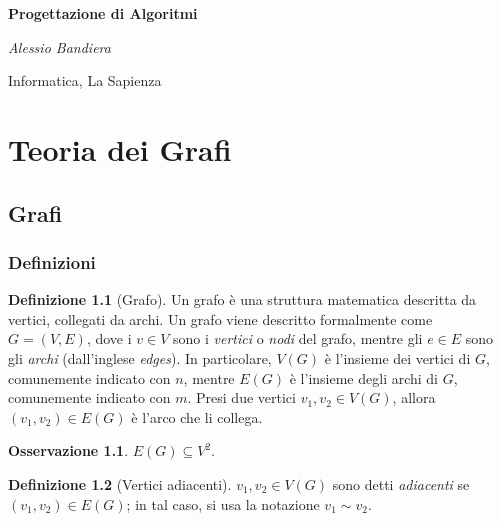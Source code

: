 \documentclass[14pt]{extreport}
\theoremstyle{definition}
\newtheorem{definition}{Definizione}[subsection]
\theoremstyle{definition}
\newtheorem{remark}{Osservazione}[subsection]
\begin{document}
\begin{titlepage}
    \centering
    \vspace*{1cm}

    \textbf{\huge Progettazione di Algoritmi}

    \vspace{1.5cm}

    \textit{\Large Alessio Bandiera}

    \vfill
        
    \large Informatica, La Sapienza
\end{titlepage}

\tableofcontents

\pagebreak


\chapter{Teoria dei Grafi}

\section{Grafi}

\subsection{Definizioni}

\begin{definition}[Grafo]
    Un grafo è una struttura matematica descritta da vertici, collegati da archi. Un grafo viene descritto formalmente come $G=(V, E)$, dove i $v \in V$ sono i \textit{vertici} o \textit{nodi} del grafo, mentre gli $e \in E$ sono gli \textit{archi} (dall'inglese \textit{edges}). In particolare, $V(G)$ è l'insieme dei vertici di $G$, comunemente indicato con $n$, mentre $E(G)$ è l'insieme degli archi di $G$, comunemente indicato con $m$. Presi due vertici $v_1,v_2 \in V(G)$, allora $(v_1, v_2) \in E(G)$ è l'arco che li collega.
\end{definition}

\begin{remark}
    $E(G) \subseteq V^2$.
\end{remark}

\begin{definition}[Vertici adiacenti]
    $v_1, v_2 \in V(G)$ sono detti \textit{adiacenti} se $(v_1, v_2) \in E(G)$; in tal caso, si usa la notazione $v_1 \sim v_2$.
\end{definition}
\end{document}
